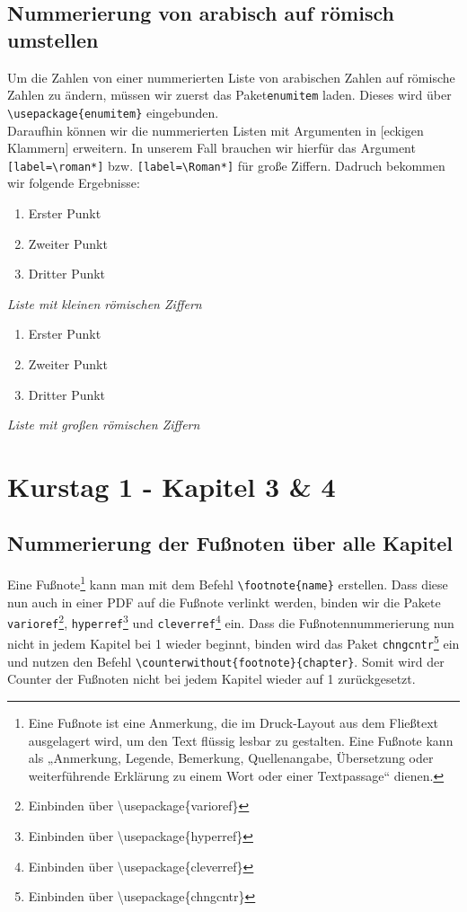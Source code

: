 \documentclass[
12pt,
ngerman
]{scrreprt}
\begin{document}
\section{Nummerierung von arabisch auf römisch umstellen}
\label{sec:enum-label}
Um die Zahlen von einer nummerierten Liste von arabischen Zahlen auf römische Zahlen zu ändern, müssen wir zuerst das Paket\verb!enumitem! laden. Dieses wird über \verb!\usepackage{enumitem}! eingebunden. \\
Daraufhin können wir die nummerierten Listen mit Argumenten in [eckigen Klammern] erweitern. In unserem Fall brauchen wir hierfür das Argument \verb![label=\roman*]! bzw. \verb![label=\Roman*]! für große Ziffern. Dadruch bekommen wir folgende Ergebnisse:
\begin{multicols}{2}
  \begin{enumerate}[label=\roman*]
    \item Erster Punkt
    \item Zweiter Punkt
    \item Dritter Punkt
  \end{enumerate}
  \emph{Liste mit kleinen römischen Ziffern}
  \begin{enumerate}[label=\Roman*]
    \item Erster Punkt
    \item Zweiter Punkt
    \item Dritter Punkt
  \end{enumerate}
  \emph{Liste mit großen römischen Ziffern}
\end{multicols}

\chapter{Kurstag 1 - Kapitel 3 \& 4}
\label{cha:chap3-4}
\label{blatt:2}

\section{Nummerierung der Fußnoten über alle Kapitel}
\label{sec:footnotes}
Eine Fußnote\footnote{Eine Fußnote ist eine Anmerkung, die im Druck-Layout aus dem Fließtext ausgelagert wird, um den Text flüssig lesbar zu gestalten. Eine Fußnote kann als „Anmerkung, Legende, Bemerkung, Quellenangabe, Übersetzung oder weiterführende Erklärung zu einem Wort oder einer Textpassage“ dienen.} kann man mit dem Befehl \verb!\footnote{name}! erstellen. Dass diese nun auch in einer PDF auf die Fußnote verlinkt werden, binden wir die Pakete \verb!varioref!\footnote{Einbinden über \textbackslash usepackage\{varioref\}}, \verb!hyperref!\footnote{Einbinden über \textbackslash usepackage\{hyperref\}} und \verb!cleverref!\footnote{Einbinden über \textbackslash usepackage\{cleverref\}} ein. Dass die Fußnotennummerierung nun nicht in jedem Kapitel bei 1 wieder beginnt, binden wird das Paket \verb!chngcntr!\footnote{Einbinden über \textbackslash usepackage\{chngcntr\}} ein und nutzen den Befehl \verb!\counterwithout{footnote}{chapter}!. Somit wird der Counter der Fußnoten nicht bei jedem Kapitel wieder auf 1 zurückgesetzt.
\end{document}
